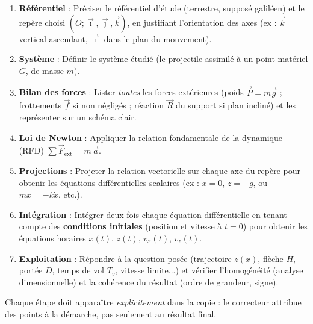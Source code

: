 \documentclass[11pt]{article}
\begin{document}
\begin{methode}
\begin{enumerate}
\item \textbf{Référentiel} : Préciser le référentiel d'étude (terrestre, supposé galiléen) et le repère choisi $(O;\vec{\imath},\vec{\jmath},\vec{k})$, en justifiant l'orientation des axes (ex : $\vec{k}$ vertical ascendant, $\vec{\imath}$ dans le plan du mouvement).
\item \textbf{Système} : Définir le système étudié (le projectile assimilé à un point matériel $G$, de masse $m$).
\item \textbf{Bilan des forces} : Lister \emph{toutes} les forces extérieures (poids $\vec{P} = m\vec{g}$ ; frottements $\vec{f}$ si non négligés ; réaction $\vec{R}$ du support si plan incliné) et les représenter sur un schéma clair.
\item \textbf{Loi de Newton} : Appliquer la relation fondamentale de la dynamique (RFD) $\sum \vec{F}_{\text{ext}} = m\,\vec{a}$.
\item \textbf{Projections} : Projeter la relation vectorielle sur chaque axe du repère pour obtenir les équations différentielles scalaires (ex : $\ddot{x} = 0$, $\ddot{z} = -g$, ou $m\ddot{x} = -k\dot{x}$, etc.).
\item \textbf{Intégration} : Intégrer deux fois chaque équation différentielle en tenant compte des \textbf{conditions initiales} (position et vitesse à $t=0$) pour obtenir les équations horaires $x(t)$, $z(t)$, $v_x(t)$, $v_z(t)$.
\item \textbf{Exploitation} : Répondre à la question posée (trajectoire $z(x)$, flèche $H$, portée $D$, temps de vol $T_v$, vitesse limite...) et vérifier l'homogénéité (analyse dimensionnelle) et la cohérence du résultat (ordre de grandeur, signe).
\end{enumerate}
Chaque étape doit apparaître \emph{explicitement} dans la copie : le correcteur attribue des points à la démarche, pas seulement au résultat final.
\end{methode}
\end{document}

